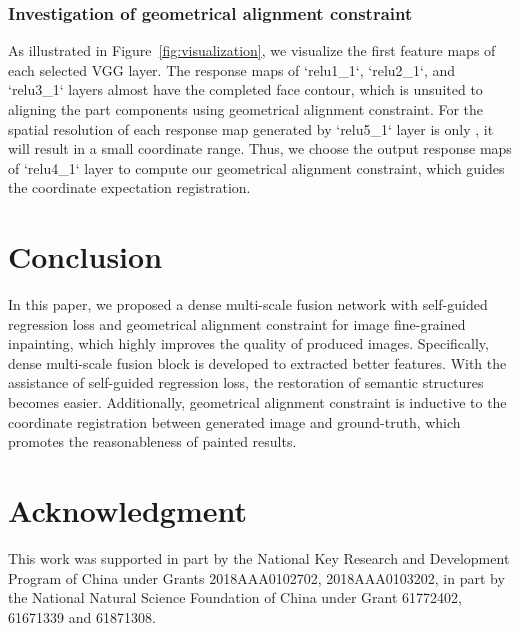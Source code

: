 \documentclass[journal]{IEEEtran}
\begin{document}
\subsubsection{Investigation of geometrical alignment constraint}
As illustrated in Figure~\ref{fig:visualization}, we visualize the first  feature maps of each selected VGG layer. The response maps of `relu1\_1`, `relu2\_1`, and `relu3\_1` layers almost have the completed face contour, which is unsuited to aligning the part components using geometrical alignment constraint. For the spatial resolution of each response map generated by `relu5\_1` layer is only , it will result in a small coordinate range. Thus, we choose the output response maps of `relu4\_1` layer to compute our geometrical alignment constraint, which guides the coordinate expectation registration.

\section{Conclusion}\label{sec:conclusion}

In this paper, we proposed a dense multi-scale fusion network with self-guided regression loss and geometrical alignment constraint for image fine-grained inpainting, which highly improves the quality of produced images. Specifically, dense multi-scale fusion block is developed to extracted better features. With the assistance of self-guided regression loss, the restoration of semantic structures becomes easier. Additionally, geometrical alignment constraint is inductive to the coordinate registration between generated image and ground-truth, which promotes the reasonableness of painted results.

\section*{Acknowledgment}
This work was supported in part by the National Key Research and Development Program of China under Grants 2018AAA0102702, 2018AAA0103202, in part by the National Natural Science Foundation of China under Grant 61772402, 61671339 and 61871308.


\end{document}

